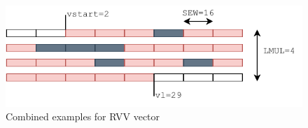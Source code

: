 \begin{figure}
    \centering
    \includegraphics[width=\textwidth]{Figures/RVV_examples_combined.pdf}
    \caption{Combined examples for RVV vector}
    \label{fig:RVV_examples_combined}
\end{figure}